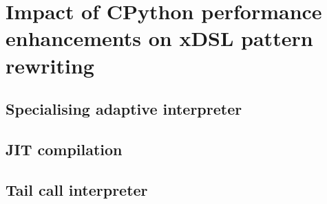\chapter{Impact of CPython performance enhancements on xDSL pattern rewriting}

\section{Specialising adaptive interpreter}
\section{JIT compilation}
\section{Tail call interpreter}



